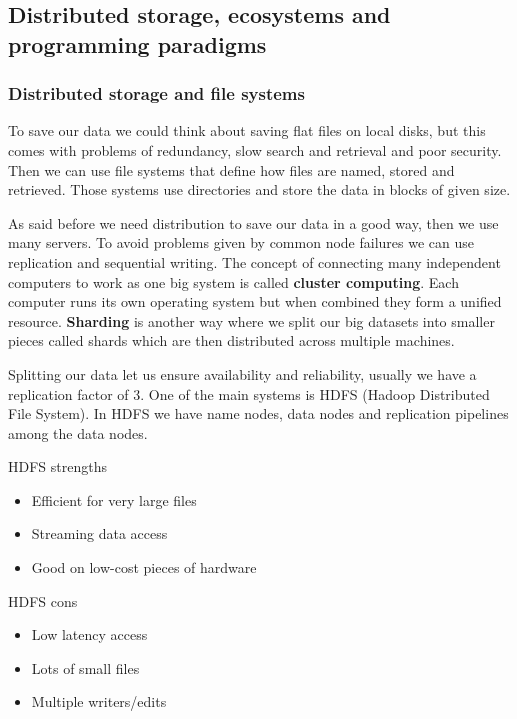 \subsection{Distributed storage, ecosystems and programming paradigms}

\subsubsection{Distributed storage and file systems}

To save our data we could think about saving flat files on local disks, but this comes with problems of redundancy, slow search and retrieval and poor security. Then we can use file systems that define how files are named, stored and retrieved. Those systems use directories and store the data in blocks of given size. 

\vspace{10pt}

As said before we need distribution to save our data in a good way, then we use many servers. To avoid problems given by common node failures we can use replication and sequential writing. The concept of connecting many independent computers to work as one big system is called \textbf{cluster computing}. Each computer runs its own operating system but when combined they form a unified resource. \textbf{Sharding} is another way where we split our big datasets into smaller pieces called shards which are then distributed across multiple machines. 

\vspace{10pt}

Splitting our data let us ensure availability and reliability, usually we have a replication factor of 3. One of the main systems is HDFS (Hadoop Distributed File System). In HDFS we have name nodes, data nodes and replication pipelines among the data nodes. 

\vspace{10pt}

HDFS strengths

\begin{itemize}
    \item Efficient for very large files
    \item Streaming data access
    \item Good on low-cost pieces of hardware
\end{itemize}

HDFS cons
\begin{itemize}
    \item Low latency access
    \item Lots of small files
    \item Multiple writers/edits
\end{itemize}

